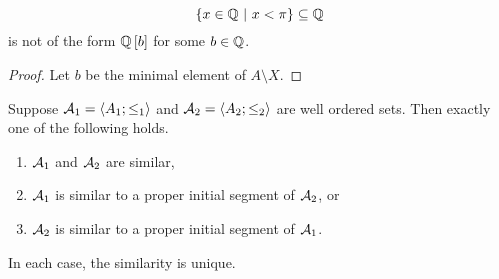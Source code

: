 \begin{example*}
$$ \cbr{x \in \QQ \st x < \pi} \subseteq \QQ $$
is not of the form $ \QQ\sbr{b} $ for some $ b \in \mathbb{Q} $.
\end{example*}

\begin{proof}
Let $ b $ be the minimal element of $ A \setminus X $.
\end{proof}

\pagebreak

\begin{theorem}
\label{thm:3.3.7}
Suppose $ \mathcal{A}_1 = \left\langle A_1; \le_1 \right\rangle $ and $ \mathcal{A}_2 = \left\langle A_2; \le_2 \right\rangle $ are well ordered sets. Then exactly one of the following holds.
\begin{enumerate}
\item $ \mathcal{A}_1 $ and $ \mathcal{A}_2 $ are similar,
\item $ \mathcal{A}_1 $ is similar to a proper initial segment of $ \mathcal{A}_2 $, or
\item $ \mathcal{A}_2 $ is similar to a proper initial segment of $ \mathcal{A}_1 $.
\end{enumerate}
In each case, the similarity is unique.
\end{theorem}

